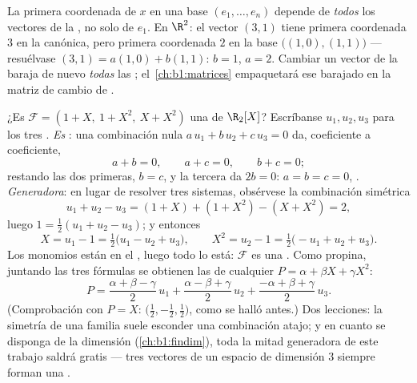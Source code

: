 \begin{remark}
\label{rem:b1:vspaces:teameffort}
La primera coordenada de $x$ en una base $(e_1, \dots, e_n)$ depende
de \emph{todos} los vectores de la , no solo de $e_1$. En
$\R^2$: el vector $(3, 1)$ tiene primera coordenada $3$ en la 
canónica, pero primera coordenada $2$ en la base
$\bigl((1,0), (1,1)\bigr)$ --- resuélvase $(3,1) = a(1,0) + b(1,1)$:
$b = 1$, $a = 2$. Cambiar un vector de la  baraja de nuevo
\emph{todas} las ; el~\cref{ch:b1:matrices} empaquetará
ese barajado en la matriz de cambio de .
\end{remark}

\begin{example}
\label{ex:b1:vspaces:testbasis}
¿Es $\mathcal{F} = (1 + X,\ 1 + X^2,\ X + X^2)$ una  de
$\R_2[X]$? Escríbanse $u_1, u_2, u_3$ para los tres .
\emph{Es }: una combinación nula $a\,u_1 + b\,u_2 + c\,u_3 = 0$
da, coeficiente a coeficiente,
\[
a + b = 0, \qquad a + c = 0, \qquad b + c = 0 ;
\]
restando las dos primeras, $b = c$, y la tercera da $2b = 0$:
$a = b = c = 0$, . \emph{Generadora}: en lugar de resolver tres
sistemas, obsérvese la combinación simétrica
\[
u_1 + u_2 - u_3 = (1 + X) + (1 + X^2) - (X + X^2) = 2 ,
\]
luego $1 = \frac12(u_1 + u_2 - u_3)$; y entonces
\[
X = u_1 - 1 = \tfrac12\bigl(u_1 - u_2 + u_3\bigr),
\qquad
X^2 = u_2 - 1 = \tfrac12\bigl(-u_1 + u_2 + u_3\bigr).
\]
Los monomios están en el , luego todo lo está:
$\mathcal{F}$ es una . Como propina, juntando las tres fórmulas
se obtienen las  de cualquier
$P = \alpha + \beta X + \gamma X^2$:
\[
P = \frac{\alpha + \beta - \gamma}{2}\,u_1
+ \frac{\alpha - \beta + \gamma}{2}\,u_2
+ \frac{-\alpha + \beta + \gamma}{2}\,u_3 .
\]
(Comprobación con $P = X$: 
$\bigl(\frac12, -\frac12, \frac12\bigr)$, como se halló antes.) Dos
lecciones: la simetría de una familia suele esconder una combinación
atajo; y en cuanto se disponga de la dimensión (\cref{ch:b1:findim}),
toda la mitad generadora de este trabajo saldrá gratis --- tres
vectores  de un espacio de dimensión $3$ siempre forman una
.
\end{example}

